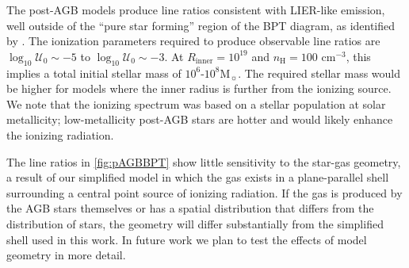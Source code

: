 \documentclass[linenumbers, tighten, trackchanges]{aastex61}%
\newcommand{\Fig}[1]{\autoref{fig:#1}}
\newcommand{\logten}{\ensuremath{\log_{10}}}
\newcommand\Msun{\ensuremath{\mathrm{M_{\sun}}}}
\newcommand{\nH}{\ensuremath{n_{\mathrm{H}}}}
\newcommand{\Rin}{\ensuremath{R_{\mathrm{inner}}}}
\newcommand{\logU}{\ensuremath{\logten \mathcal{U}_0}}
\begin{document}
The post-AGB models produce line ratios consistent with LIER-like emission, well outside of the ``pure star forming'' region of the BPT diagram, as identified by \citet{Kauffmann03a}. The ionization parameters required to produce observable line ratios are $\logU \sim -5$ to  $\logU \sim -3$. At $\Rin=10^{19}$ and $\nH=100$ cm$^{-3}$, this implies a total initial stellar mass of $10^6$-$10^8\Msun$. The required stellar mass would be higher for models where the inner radius is further from the ionizing source. We note that the ionizing spectrum was based on a stellar population at solar metallicity; low-metallicity post-AGB stars are hotter and would likely enhance the ionizing radiation.

The line ratios in \Fig{pAGBBPT} show little sensitivity to the star-gas geometry, a result of our simplified model in which the gas exists in a plane-parallel shell surrounding a central point source of ionizing radiation. If the gas is produced by the AGB stars themselves or has a spatial distribution that differs from the distribution of stars, the geometry will differ substantially from the simplified shell used in this work. In future work we plan to test the effects of model geometry in more detail. 
\end{document}
